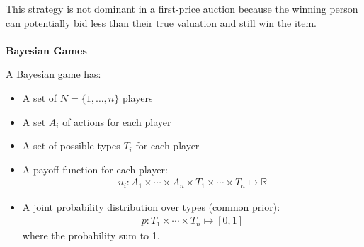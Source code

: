 \documentclass{article}
\begin{document}
This strategy is not dominant in a first-price auction because the winning person can potentially bid less than their true valuation and still win the item.
\\~\\
\textbf{Bayesian Games}

A Bayesian game has:
\begin{itemize}
\item A set of $N = \{1,\ldots, n\}$ players
\item A set $A_i$ of actions for each player
\item A set of possible types $T_i$ for each player
\item A payoff function for each player:
\begin{align*}
u_i: A_1\times \cdots \times A_n \times T_1 \times \cdots \times T_n \mapsto \mathbb{R}
\end{align*} 
\item A joint probability distribution over types (common prior):
\begin{align*}
p : T_1 \times \cdots \times T_n \mapsto[0, 1]
\end{align*}
where the probability sum to 1.
\end{itemize}
\end{document}
